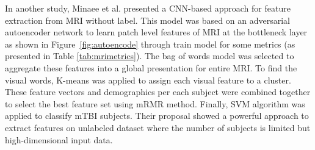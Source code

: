 \documentclass[runningheads]{llncs}
\begin{document}
In another study, Minaee et al.\cite{minaee_mtbi_2019} presented a CNN-based approach for feature extraction from MRI without label. This model was based on an adversarial autoencoder network to learn patch level features of MRI at the bottleneck layer as shown in Figure~\ref{fig:autoencode} through train model for some metrics (as presented in Table \ref{tab:mrimetrics}). The bag of words model was selected to aggregate these features into a global presentation for entire MRI. To find the visual words, K-means was applied to assign each visual feature to a cluster. These feature vectors and demographics per each subject were combined together to select the best feature set using mRMR method. Finally, SVM algorithm was applied to classify mTBI subjects. Their proposal showed a powerful approach to extract features on unlabeled dataset where the number of subjects is limited but high-dimensional input data.
\end{document}

